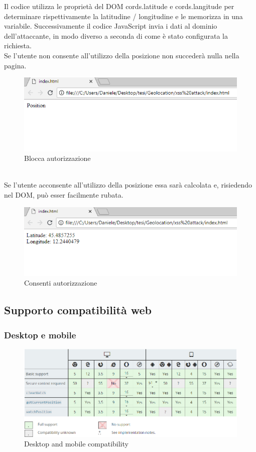\documentclass[11pt ,a4paper , twoside , openright ]{article}
\begin{document}

Il codice utilizza le proprietà del DOM cords.latitude e cords.langitude per determinare rispettivamente la latitudine / longitudine e le memorizza in una variabile. Successivamente il codice JavaScript invia i dati al dominio dell'attaccante, in modo diverso a seconda di come è stato configurata la richiesta.
\\
\clearpage
Se l'utente non consente all'utilizzo della posizione non succederà nulla nella pagina.
\begin{figure}[h]
	\centering
	\includegraphics[width=1\linewidth]{Blocca}
	\caption{Blocca autorizzazione}
	\label{fig: Blocca autorizzazione}
\end{figure}
\\
Se l'utente acconsente all'utilizzo della posizione essa sarà calcolata e, risiedendo nel DOM, può esser facilmente rubata.
\begin{figure}[h]
	\centering
	\includegraphics[width=1\linewidth]{Consenti}
	\caption{Consenti autorizzazione}
	\label{fig: Consenti autorizzazione}
\end{figure}
\clearpage
\subsection{Supporto compatibilità web}
\subsubsection{Desktop e mobile}
\begin{figure}[h]
	\centering
	\includegraphics[width=1\linewidth]{compatibility}
	\caption{Desktop and mobile compatibility}
	\label{fig: Desktop and mobile compatibility}
\end{figure}
\end{document}
